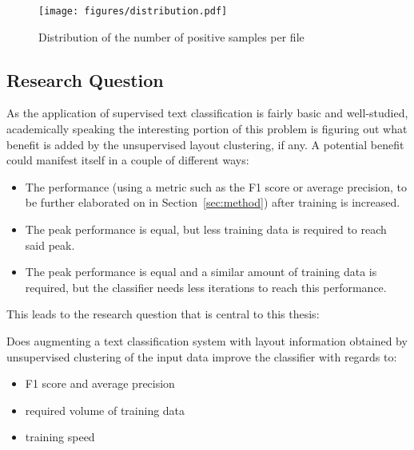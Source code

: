 \begin{figure}[htbp]
  \centering
  \texttt{[image: figures/distribution.pdf]}
  \caption{Distribution of the number of positive samples per file}
  \label{fig:data_dist}
\end{figure}

\subsection{Research Question}
As the application of supervised text classification is fairly basic and
well-studied, academically speaking the interesting portion of this problem is
figuring out what benefit is added by the unsupervised layout clustering, if
any. A potential benefit could manifest itself in a couple of different ways:
\begin{itemize}
\item The performance (using a metric such as the F1 score or average
  precision, to be further elaborated on in Section~\ref{sec:method}) after
  training is increased.
\item The peak performance is equal, but less training data is required to reach
  said peak.
\item The peak performance is equal and a similar amount of training data is
  required, but the classifier needs less iterations to reach this performance.
\end{itemize}
This leads to the research question that is central to this thesis:
\begin{researchquestion}
  Does augmenting a text classification system with layout information obtained
  by unsupervised clustering of the input data improve the classifier with
  regards to:
  \begin{itemize}
  \item F1 score and average precision
  \item required volume of training data
  \item training speed
  \end{itemize}
\end{researchquestion}

